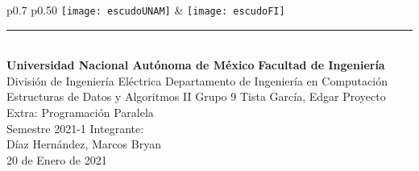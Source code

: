 \begin{titlepage}
	\begin{center}
		{ 
			\begin{tabular}{p{0.7\textwidth} p{0.50\textwidth} }
				\texttt{[image: escudoUNAM]} &  \texttt{[image: escudoFI]}
			\end{tabular}
		}
		
		\textcolor{azul}{\rule{\linewidth}{0.8mm}}\\
		\vfill
		{\LARGE \textbf{Universidad Nacional Autónoma de México}}
		\vfill
		{\LARGE \textbf{Facultad de Ingeniería}}
		\vfill
		{\Large {División de Ingeniería Eléctrica}}
		\vfill
		{\Large {Departamento de Ingeniería en Computación}}
		\vfill
		{\huge {Estructuras de Datos y Algoritmos II}}
		\vfill
		{\LARGE {Grupo 9}}
		\vfill
		{\LARGE {Tista García, Edgar}}
		\vfill
		{\LARGE {Proyecto Extra: Programación Paralela\\}}
		\vspace{3mm}
		{\LARGE {Semestre 2021-1}}
		\vfill
		{\Large {Integrante:\\}}
		\vspace{3mm}
		{\Large {Díaz Hernández, Marcos Bryan\\}}
		\vspace{3mm}
		{\LARGE {20 de Enero de 2021}}
	\end{center}
\end{titlepage}